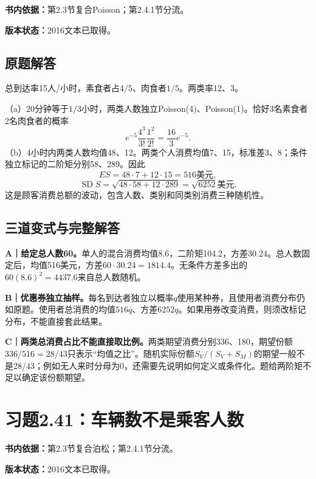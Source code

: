 \documentclass[
  11pt,
  a4paper,
  UTF8,fontset=fandol]{ctexart}
\let\OldSection\section
\renewcommand{\section}{\Needspace{7\baselineskip}\OldSection}
\let\OldSubsection\subsection
\renewcommand{\subsection}{\Needspace{5\baselineskip}\OldSubsection}
\begin{document}
\textbf{书内依据：}第2.3节复合Poisson；第2.4.1节分流。

\textbf{版本状态：}2016文本已取得。

\subsection{原题解答}\label{ux539fux9898ux89e3ux7b54-39}

总到达率15人/小时，素食者占\(4/5\)、肉食者\(1/5\)。两类率12、3。

（a）20分钟等于\(1/3\)小时，两类人数独立Poisson(4)、Poisson(1)。恰好3名素食者2名肉食者的概率
\[\boxed{e^{-5}\frac{4^3}{3!}\frac{1^2}{2!}=\frac{16}{3}e^{-5}.}\]
（b）4小时内两类人数均值48、12。两类个人消费均值7、15，标准差3、8；条件独立标记的二阶矩分别58、289。因此
\[\boxed{ES=48\cdot7+12\cdot15=516\text{美元}},\]
\[\boxed{\operatorname{SD}S=\sqrt{48\cdot58+12\cdot289}=\sqrt{6252}\text{美元}.}\]
这是顾客消费总额的波动，包含人数、类别和同类别消费三种随机性。

\subsection{三道变式与完整解答}\label{ux4e09ux9053ux53d8ux5f0fux4e0eux5b8cux6574ux89e3ux7b54-39}

\textbf{A｜给定总人数60。}单人的混合消费均值8.6，二阶矩104.2，方差30.24。总人数固定后，均值516美元，方差\(60\cdot30.24=1814.4\)。无条件方差多出的\(60(8.6)^2=4437.6\)来自总人数随机。

\textbf{B｜优惠券独立抽样。}每名到达者独立以概率\(q\)使用某种券，且使用者消费分布仍如原题。使用者总消费的均值\(516q\)、方差\(6252q\)。如果用券改变消费，则须改标记分布，不能直接套此结果。

\textbf{C｜两类总消费占比不能直接取比例。}两类期望消费分别336、180，期望份额\(336/516=28/43\)只表示``均值之比''。随机实际份额\(S_V/(S_V+S_M)\)的期望一般不是28/43；例如无人来时分母为0，还需要先说明如何定义或条件化。题给两阶矩不足以确定该份额期望。

\newpage

\section{习题2.41：车辆数不是乘客人数}\label{ux4e60ux98982.41ux8f66ux8f86ux6570ux4e0dux662fux4e58ux5ba2ux4ebaux6570}

\textbf{书内依据：}第2.3节复合泊松；第2.4.1节分流。

\textbf{版本状态：}2016文本已取得。
\end{document}
